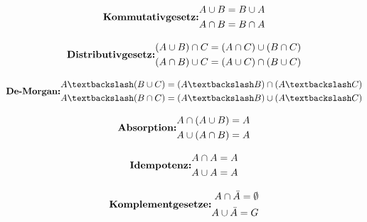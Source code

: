 \begin{equation}
\textbf{Kommutativgesetz:}
\begin{aligned}
A \cup B = B \cup A \\
A \cap B = B \cap A \notag
\end{aligned}
\end{equation}

\begin{equation}
\textbf{Distributivgesetz:}
\begin{aligned}
(A \cup B) \cap C = (A \cap C) \cup (B \cap C) \\
(A \cap B) \cup C = (A \cup C) \cap (B \cup C) \notag
\end{aligned}
\end{equation}

\begin{equation}
\textbf{De-Morgan:}
\begin{aligned}
A \textbackslash (B \cup C) = (A \textbackslash B) \cap (A \textbackslash C) \\
A \textbackslash (B \cap C) = (A \textbackslash B) \cup (A \textbackslash C) \notag
\end{aligned}
\end{equation}

\begin{equation}
\textbf{Absorption:}
\begin{aligned}
A \cap (A \cup B) = A \\
A \cup (A \cap B) = A \notag
\end{aligned}
\end{equation}

\begin{equation}
\textbf{Idempotenz:}
\begin{aligned}
A \cap A = A \\
A \cup A = A \notag
\end{aligned}
\end{equation}

\begin{equation}
\textbf{Komplementgesetze:}
\begin{aligned}
A \cap \bar{A} = \emptyset \\
A \cup \bar{A} = G \notag
\end{aligned}
\end{equation}

\vspace{-0.5cm}

